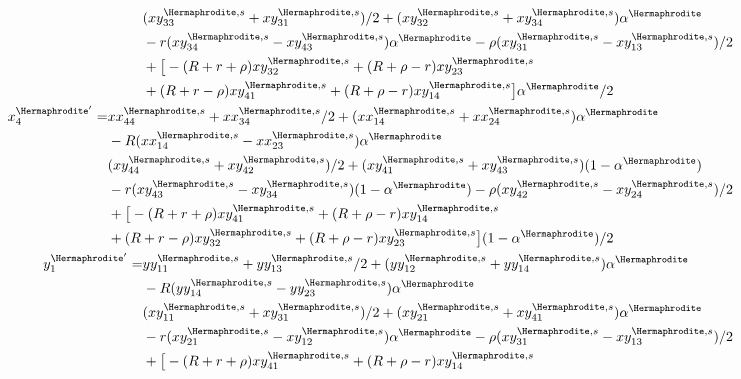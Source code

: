\documentclass[12pt]{article}
\begin{document}
\begin{subequations}
\begin{align}
\begin{split}
&(xy_{33}^{\Hermaphrodite,s}+xy_{31}^{\Hermaphrodite,s})/2+(xy_{32}^{\Hermaphrodite,s}+xy_{34}^{\Hermaphrodite,s})\alpha^\Hermaphrodite\\
&- r(xy_{34}^{\Hermaphrodite,s}-xy_{43}^{\Hermaphrodite,s}) \alpha^\Hermaphrodite - \rho(xy_{31}^{\Hermaphrodite,s}-xy_{13}^{\Hermaphrodite,s})/2\\
&+\big{[}-(R+r+\rho)xy_{32}^{\Hermaphrodite,s} +(R+\rho-r)xy_{23}^{\Hermaphrodite,s}\\
&+(R+r-\rho) xy_{41}^{\Hermaphrodite,s}+(R+\rho-r)xy_{14}^{\Hermaphrodite,s}\big{]} \alpha^\Hermaphrodite/2
\end{split}
\\
%
\begin{split}
x_{4}^{{\Hermaphrodite}'}=&xx_{44}^{\Hermaphrodite,s}+xx_{34}^{\Hermaphrodite,s}/2+(xx_{14}^{\Hermaphrodite,s}+xx_{24}^{\Hermaphrodite,s})\alpha^\Hermaphrodite\\
&-R(xx_{14}^{\Hermaphrodite,s}-xx_{23}^{\Hermaphrodite,s}) \alpha^\Hermaphrodite\\
&(xy_{44}^{\Hermaphrodite,s}+xy_{42}^{\Hermaphrodite,s})/2+(xy_{41}^{\Hermaphrodite,s}+xy_{43}^{\Hermaphrodite,s})(1-\alpha^\Hermaphrodite)\\
&- r(xy_{43}^{\Hermaphrodite,s}-xy_{34}^{\Hermaphrodite,s})(1-\alpha^\Hermaphrodite) - \rho(xy_{42}^{\Hermaphrodite,s}-xy_{24}^{\Hermaphrodite,s})/2\\
&+\big{[}-(R+r+\rho)xy_{41}^{\Hermaphrodite,s}+(R+\rho-r)xy_{14}^{\Hermaphrodite,s}\\
&+(R+r-\rho) xy_{32}^{\Hermaphrodite,s}+(R+\rho-r)xy_{23}^{\Hermaphrodite,s}\big{]}(1-\alpha^\Hermaphrodite)/2
\end{split}
\\
\begin{split}
y_{1}^{{\Hermaphrodite}'}=&yy_{11}^{\Hermaphrodite,s}+yy_{13}^{\Hermaphrodite,s}/2+(yy_{12}^{\Hermaphrodite,s}+yy_{14}^{\Hermaphrodite,s})\alpha^\Hermaphrodite\\
&-R(yy_{14}^{\Hermaphrodite,s}-yy_{23}^{\Hermaphrodite,s}) \alpha^\Hermaphrodite\\
&(xy_{11}^{\Hermaphrodite,s}+xy_{31}^{\Hermaphrodite,s})/2+(xy_{21}^{\Hermaphrodite,s}+xy_{41}^{\Hermaphrodite,s})\alpha^\Hermaphrodite\\
&- r(xy_{21}^{\Hermaphrodite,s}-xy_{12}^{\Hermaphrodite,s})\alpha^\Hermaphrodite - \rho(xy_{31}^{\Hermaphrodite,s}-xy_{13}^{\Hermaphrodite,s})/2\\
&+\big{[} - (R+r+\rho)xy_{41}^{\Hermaphrodite,s} + (R+\rho-r)xy_{14}^{\Hermaphrodite,s}\\

\end{split}
\end{align}
\end{subequations}
\end{document}
